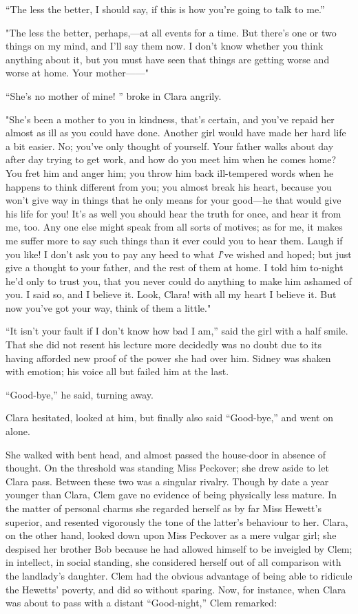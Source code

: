 ``The less the better, I should say, if this is how you're going to talk
to me.''

"The less the better, perhaps,---at all events for a time. But there's
one or two things on my mind, and I'll say them now. I don't know
whether you think anything about it, but you must have seen that things
are getting worse and worse at home. Your mother{{------}}"

``She's no mother of mine! '' broke in Clara angrily.

"She's been a mother to you in kindness, that's certain, and you've
repaid her almost as ill as you could have done. Another girl would have
made her hard life a bit easier. No; you've only thought of yourself.
Your {\protect\hypertarget{78}{}{}}father walks about day after day
trying to get work, and how do you meet him when he comes home? You fret
him and anger him; you throw him back ill-tempered words when he happens
to think different from you; you almost break his heart, because you
won't give way in things that he only means for your good---he that
would give his life for you! It's as well you should hear the truth for
once, and hear it from me, too. Any one else might speak from all sorts
of motives; as for me, it makes me suffer more to say such things than
it ever could you to hear them. Laugh if you like! I don't ask you to
pay any heed to what \emph{I}'ve wished and hoped; but just give a
thought to your father, and the rest of them at home. I told him
to-night he'd only to trust you, that you never could do anything to
make him ashamed of you. I said so, and I believe it. Look, Clara! with
all my heart I believe it. But now you've got your way, think of them a
little."

``It isn't your fault if I don't know how bad I am,'' said the girl with
a half smile. {\protect\hypertarget{79}{}{}}That she did not resent his
lecture more decidedly was no doubt due to its having afforded new proof
of the power she had over him. Sidney was shaken with emotion; his voice
all but failed him at the last.

``Good-bye,'' he said, turning away.

Clara hesitated, looked at him, but finally also said ``Good-bye,'' and
went on alone.

She walked with bent head, and almost passed the house-door in absence
of thought. On the threshold was standing Miss Peckover; she drew aside
to let Clara pass. Between these two was a singular rivalry. Though by
date a year younger than Clara, Clem gave no evidence of being
physically less mature. In the matter of personal charms she regarded
herself as by far Miss Hewett's superior, and resented vigorously the
tone of the latter's behaviour to her. Clara, on the other hand, looked
down upon Miss Peckover as a mere vulgar girl; she despised her brother
Bob because he had allowed himself to be inveigled by Clem; in
intellect, in social standing, she considered
{\protect\hypertarget{80}{}{}}herself out of all comparison with the
landlady's daughter. Clem had the obvious advantage of being able to
ridicule the Hewetts' poverty, and did so without sparing. Now, for
instance, when Clara was about to pass with a distant ``Good-night,''
Clem remarked:

